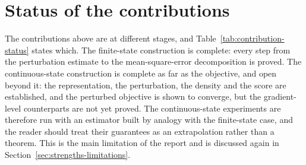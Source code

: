 \section{Status of the contributions}
\label{sec:contribution-status}

The contributions above are at different stages, and Table~\ref{tab:contribution-status} states which. The finite-state construction is complete: every step from the perturbation estimate to the mean-square-error decomposition is proved. The continuous-state construction is complete as far as the objective, and open beyond it: the representation, the perturbation, the density and the score are established, and the perturbed objective is shown to converge, but the gradient-level counterparts are not yet proved. The continuous-state experiments are therefore run with an estimator built by analogy with the finite-state case, and the reader should treat their guarantees as an extrapolation rather than a theorem. This is the main limitation of the report and is discussed again in Section~\ref{sec:strengths-limitations}.

